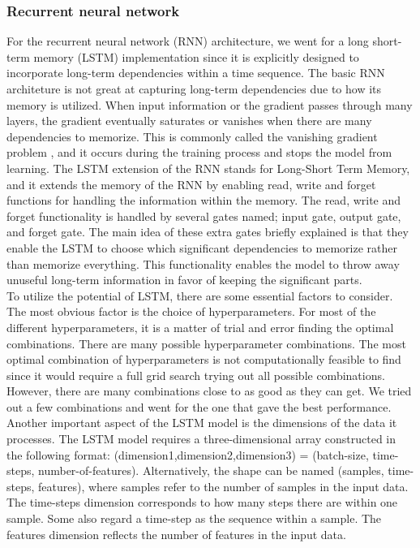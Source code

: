 \documentclass[11pt]{article}
\begin{document}
\subsubsection*{Recurrent neural network}
For the recurrent neural network (RNN) architecture, we went for a long short-term memory (LSTM) implementation since it is explicitly designed to incorporate long-term dependencies within a time sequence. The basic RNN architeture is not great at capturing long-term dependencies due to how its memory is utilized. When input information or the gradient passes through many layers, the gradient eventually saturates or vanishes when there are many dependencies to memorize. This is commonly called the vanishing gradient problem \cite{siami-namini-et-al}, and it occurs during the training process and stops the model from learning. The LSTM extension of the RNN stands for Long-Short Term Memory, and it extends the memory of the RNN by enabling read, write and forget functions for handling the information within the memory. The read, write and forget functionality is handled by several gates named; input gate, output gate, and forget gate. The main idea of these extra gates briefly explained is that they enable the LSTM to choose which significant dependencies to memorize rather than memorize everything.
This functionality enables the model to throw away unuseful long-term information in favor of keeping the significant parts. \\
To utilize the potential of LSTM, there are some essential factors to consider.
The most obvious factor is the choice of hyperparameters.
For most of the different hyperparameters, it is a matter of trial and error finding the optimal combinations.
There are many possible hyperparameter combinations.
The most optimal combination of hyperparameters is not computationally feasible to find since it would require a full grid search trying out all possible combinations.
However, there are many combinations close to as good as they can get.
We tried out a few combinations and went for the one that gave the best performance.
Another important aspect of the LSTM model is the dimensions of the data it processes.
The LSTM model requires a three-dimensional array constructed in the following format: (dimension1,dimension2,dimension3) = (batch-size, time-steps, number-of-features). Alternatively, the shape can be named (samples, time-steps, features), where samples refer to the number of samples in the input data. The time-steps dimension corresponds to how many steps there are within one sample. Some also regard a time-step as the sequence within a sample. The features dimension reflects the number of features in the input data. 
\end{document}
